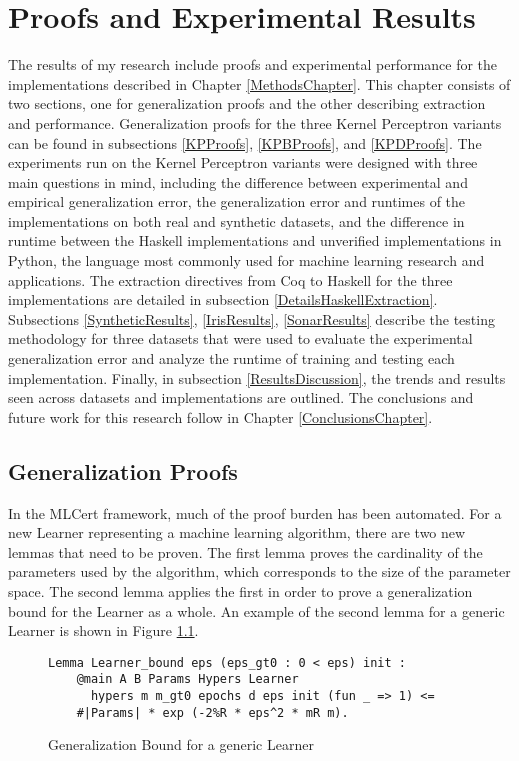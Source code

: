 \chapter{Proofs and Experimental Results}\label{ResultsChapter}
The results of my research include proofs and experimental performance for the implementations described in Chapter \ref{MethodsChapter}. This chapter consists of two sections, one for generalization proofs and the other describing extraction and performance. Generalization proofs for the three Kernel Perceptron variants can be found in subsections \ref{KPProofs}, \ref{KPBProofs}, and \ref{KPDProofs}. The experiments run on the Kernel Perceptron variants were designed with three main questions in mind, including the difference between experimental and empirical generalization error, the generalization error and runtimes of the implementations on both real and synthetic datasets, and the difference in runtime between the Haskell implementations and unverified implementations in Python, the language most commonly used for machine learning research and applications. The extraction directives from Coq to Haskell for the three implementations are detailed in subsection \ref{DetailsHaskellExtraction}. Subsections \ref{SyntheticResults}, \ref{IrisResults}, \ref{SonarResults} describe the testing methodology for three datasets that were used to evaluate the experimental generalization error and analyze the runtime of training and testing each implementation. Finally, in subsection \ref{ResultsDiscussion}, the trends and results seen across datasets and implementations are outlined. The conclusions and future work for this research follow in Chapter \ref{ConclusionsChapter}.
\section{Generalization Proofs}\label{Proofs}
In the MLCert framework, much of the proof burden has been automated. For a new Learner representing a machine learning algorithm, there are two new lemmas that need to be proven. The first lemma proves the cardinality of the parameters used by the algorithm, which corresponds to the size of the parameter space. The second lemma applies the first in order to prove a generalization bound for the Learner as a whole. An example of the second lemma for a generic Learner is shown in Figure \ref{LearnerLemma}.

\begin{figure}
    \caption{Generalization Bound for a generic Learner}
    \label{LearnerLemma}
    \begin{lstlisting}
Lemma Learner_bound eps (eps_gt0 : 0 < eps) init : 
    @main A B Params Hypers Learner
      hypers m m_gt0 epochs d eps init (fun _ => 1) <=
    #|Params| * exp (-2%R * eps^2 * mR m).
    \end{lstlisting}
\end{figure}

